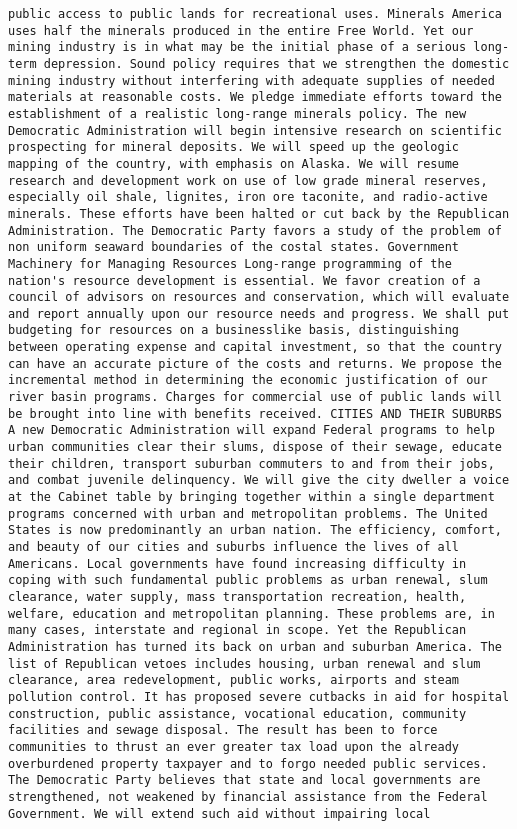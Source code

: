\documentclass[
]{article}
\begin{document}
\begin{verbatim}
public access to public lands for recreational uses. Minerals America uses half the minerals produced in the entire Free World. Yet our mining industry is in what may be the initial phase of a serious long-term depression. Sound policy requires that we strengthen the domestic mining industry without interfering with adequate supplies of needed materials at reasonable costs. We pledge immediate efforts toward the establishment of a realistic long-range minerals policy. The new Democratic Administration will begin intensive research on scientific prospecting for mineral deposits. We will speed up the geologic mapping of the country, with emphasis on Alaska. We will resume research and development work on use of low grade mineral reserves, especially oil shale, lignites, iron ore taconite, and radio-active minerals. These efforts have been halted or cut back by the Republican Administration. The Democratic Party favors a study of the problem of non uniform seaward boundaries of the costal states. Government Machinery for Managing Resources Long-range programming of the nation's resource development is essential. We favor creation of a council of advisors on resources and conservation, which will evaluate and report annually upon our resource needs and progress. We shall put budgeting for resources on a businesslike basis, distinguishing between operating expense and capital investment, so that the country can have an accurate picture of the costs and returns. We propose the incremental method in determining the economic justification of our river basin programs. Charges for commercial use of public lands will be brought into line with benefits received. CITIES AND THEIR SUBURBS A new Democratic Administration will expand Federal programs to help urban communities clear their slums, dispose of their sewage, educate their children, transport suburban commuters to and from their jobs, and combat juvenile delinquency. We will give the city dweller a voice at the Cabinet table by bringing together within a single department programs concerned with urban and metropolitan problems. The United States is now predominantly an urban nation. The efficiency, comfort, and beauty of our cities and suburbs influence the lives of all Americans. Local governments have found increasing difficulty in coping with such fundamental public problems as urban renewal, slum clearance, water supply, mass transportation recreation, health, welfare, education and metropolitan planning. These problems are, in many cases, interstate and regional in scope. Yet the Republican Administration has turned its back on urban and suburban America. The list of Republican vetoes includes housing, urban renewal and slum clearance, area redevelopment, public works, airports and steam pollution control. It has proposed severe cutbacks in aid for hospital construction, public assistance, vocational education, community facilities and sewage disposal. The result has been to force communities to thrust an ever greater tax load upon the already overburdened property taxpayer and to forgo needed public services. The Democratic Party believes that state and local governments are strengthened, not weakened by financial assistance from the Federal Government. We will extend such aid without impairing local 
\end{verbatim}
\end{document}
